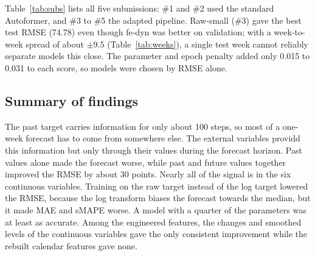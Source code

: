 \documentclass[a4, 12pt]{article}
\begin{document}
Table~\ref{tab:subs} lists all five submissions: \#1 and \#2 used the standard  Autoformer, and \#3 to \#5 the adapted pipeline. Raw-small (\#3) gave the best test RMSE (74.78) even though fe-dyn was better on validation; with a week-to-week spread of about $\pm 9.5$ (Table~\ref{tab:weeks}), a single test week cannot reliably separate models this close. The parameter and epoch penalty added only 0.015 to 0.031 to each score, so models were chosen by RMSE alone.

\begin{table}[h]
\centering
\caption{All leaderboard submissions. Validation RMSE refers to the 3-seed ensemble. The score is the RMSE plus the penalty for parameters and epochs.}
\label{tab:subs}
\small
{}
\end{table}

\subsection{Summary of findings}

The past target carries information for only about 100 steps, so most of a one-week forecast has to come from somewhere else. The external variables providd this information but only through their values during the forecast horizon. Past values alone made the forecast worse, while past and future values together improved the RMSE by about 30 points. Nearly all of the signal is in the six continuous variables. Training on the raw target instead of the log target lowered the RMSE, because the log transform biases the forecast towards the median, but it made MAE and sMAPE worse. A model with a quarter of the parameters was at least as accurate. Among the engineered features, the changes and smoothed levels of the continuous variables gave the only consistent improvement while the rebuilt calendar features gave none. 
\end{document}
